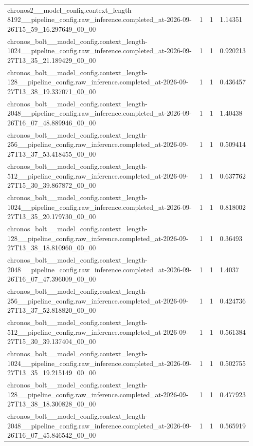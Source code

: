 \begin{tabular}{llll}
chronos2\_\_model\_config.context\_length-8192\_\_pipeline\_config.raw\_inference.completed\_at-2026-09-26T15\_59\_16.297649\_00\_00 & 1 & 1 & 1.14351 \\
chronos\_bolt\_\_model\_config.context\_length-1024\_\_pipeline\_config.raw\_inference.completed\_at-2026-09-27T13\_35\_21.189429\_00\_00 & 1 & 1 & 0.920213 \\
chronos\_bolt\_\_model\_config.context\_length-128\_\_pipeline\_config.raw\_inference.completed\_at-2026-09-27T13\_38\_19.337071\_00\_00 & 1 & 1 & 0.436457 \\
chronos\_bolt\_\_model\_config.context\_length-2048\_\_pipeline\_config.raw\_inference.completed\_at-2026-09-26T16\_07\_48.889946\_00\_00 & 1 & 1 & 1.40438 \\
chronos\_bolt\_\_model\_config.context\_length-256\_\_pipeline\_config.raw\_inference.completed\_at-2026-09-27T13\_37\_53.418455\_00\_00 & 1 & 1 & 0.509414 \\
chronos\_bolt\_\_model\_config.context\_length-512\_\_pipeline\_config.raw\_inference.completed\_at-2026-09-27T15\_30\_39.867872\_00\_00 & 1 & 1 & 0.637762 \\
chronos\_bolt\_\_model\_config.context\_length-1024\_\_pipeline\_config.raw\_inference.completed\_at-2026-09-27T13\_35\_20.179730\_00\_00 & 1 & 1 & 0.818002 \\
chronos\_bolt\_\_model\_config.context\_length-128\_\_pipeline\_config.raw\_inference.completed\_at-2026-09-27T13\_38\_18.810960\_00\_00 & 1 & 1 & 0.36493 \\
chronos\_bolt\_\_model\_config.context\_length-2048\_\_pipeline\_config.raw\_inference.completed\_at-2026-09-26T16\_07\_47.396009\_00\_00 & 1 & 1 & 1.4037 \\
chronos\_bolt\_\_model\_config.context\_length-256\_\_pipeline\_config.raw\_inference.completed\_at-2026-09-27T13\_37\_52.818820\_00\_00 & 1 & 1 & 0.424736 \\
chronos\_bolt\_\_model\_config.context\_length-512\_\_pipeline\_config.raw\_inference.completed\_at-2026-09-27T15\_30\_39.137404\_00\_00 & 1 & 1 & 0.561384 \\
chronos\_bolt\_\_model\_config.context\_length-1024\_\_pipeline\_config.raw\_inference.completed\_at-2026-09-27T13\_35\_19.215149\_00\_00 & 1 & 1 & 0.502755 \\
chronos\_bolt\_\_model\_config.context\_length-128\_\_pipeline\_config.raw\_inference.completed\_at-2026-09-27T13\_38\_18.300828\_00\_00 & 1 & 1 & 0.477923 \\
chronos\_bolt\_\_model\_config.context\_length-2048\_\_pipeline\_config.raw\_inference.completed\_at-2026-09-26T16\_07\_45.846542\_00\_00 & 1 & 1 & 0.565919 \\

\end{tabular}
